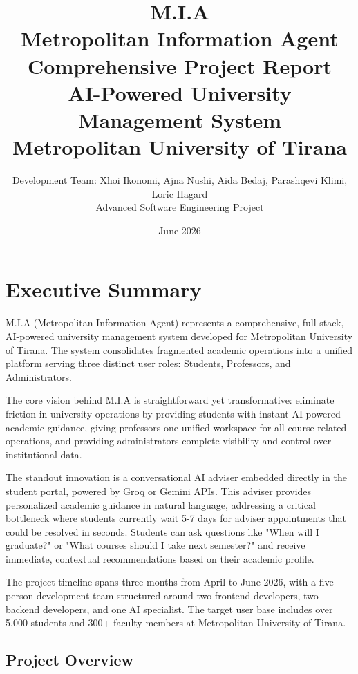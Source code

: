 \documentclass[12pt,a4paper]{report}
\title{
    \Huge \textbf{M.I.A} \\
    \Large Metropolitan Information Agent \\
    \vspace{0.8cm}
    \large Comprehensive Project Report \\
    \vspace{0.3cm}
    \normalsize AI-Powered University Management System \\
    \vspace{1.5cm}
    \small Metropolitan University of Tirana
}
\author{
    \normalsize Development Team: Xhoi Ikonomi, Ajna Nushi, Aida Bedaj, Parashqevi Klimi, Loric Hagard \\
    \vspace{1cm}
    \small Advanced Software Engineering Project
}
\date{\small June 2026}
\begin{document}
\maketitle
\thispagestyle{empty}

\tableofcontents

\setcounter{page}{1}

\chapter{Executive Summary}

M.I.A (Metropolitan Information Agent) represents a comprehensive, full-stack, AI-powered university management system developed for Metropolitan University of Tirana. The system consolidates fragmented academic operations into a unified platform serving three distinct user roles: Students, Professors, and Administrators.

The core vision behind M.I.A is straightforward yet transformative: eliminate friction in university operations by providing students with instant AI-powered academic guidance, giving professors one unified workspace for all course-related operations, and providing administrators complete visibility and control over institutional data.

The standout innovation is a conversational AI adviser embedded directly in the student portal, powered by Groq or Gemini APIs. This adviser provides personalized academic guidance in natural language, addressing a critical bottleneck where students currently wait 5-7 days for adviser appointments that could be resolved in seconds. Students can ask questions like "When will I graduate?" or "What courses should I take next semester?" and receive immediate, contextual recommendations based on their academic profile.

The project timeline spans three months from April to June 2026, with a five-person development team structured around two frontend developers, two backend developers, and one AI specialist. The target user base includes over 5,000 students and 300+ faculty members at Metropolitan University of Tirana.

\section{Project Overview}
\end{document}
